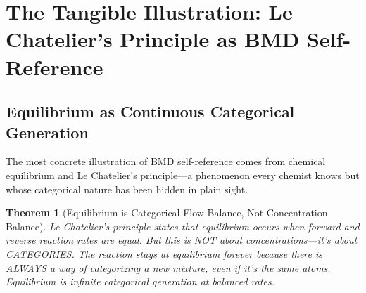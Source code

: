 \documentclass[12pt,a4paper]{article}
\newtheorem{theorem}{Theorem}[section]
\begin{document}
\section{The Tangible Illustration: Le Chatelier's Principle as BMD Self-Reference}

\subsection{Equilibrium as Continuous Categorical Generation}

The most concrete illustration of BMD self-reference comes from chemical equilibrium and Le Chatelier's principle—a phenomenon every chemist knows but whose categorical nature has been hidden in plain sight.

\begin{theorem}[Equilibrium is Categorical Flow Balance, Not Concentration Balance]
\label{thm:equilibrium_revelation}
Le Chatelier's principle states that equilibrium occurs when forward and reverse reaction rates are equal. But this is NOT about concentrations—it's about CATEGORIES. The reaction stays at equilibrium forever because there is ALWAYS a way of categorizing a new mixture, even if it's the same atoms. Equilibrium is infinite categorical generation at balanced rates.
\end{theorem}
\end{document}
